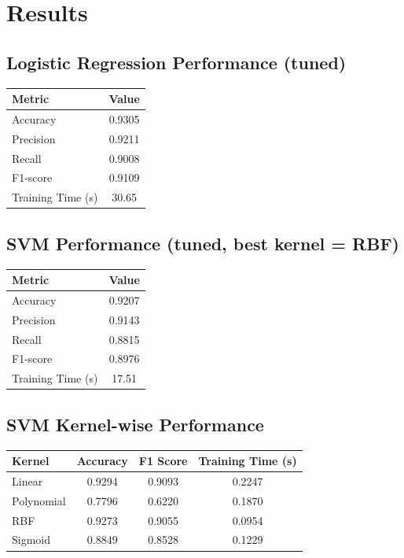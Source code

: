 \documentclass[12pt,a4paper]{article}
\begin{document}
\section{Results}

\subsection*{Logistic Regression Performance (tuned)}
\begin{tabular}{lc}
\toprule
Metric & Value\\
\midrule
Accuracy & 0.9305 \\
Precision & 0.9211 \\
Recall & 0.9008 \\
F1-score & 0.9109 \\
Training Time (s) & 30.65 \\
\bottomrule
\end{tabular}

\subsection*{SVM Performance (tuned, best kernel = RBF)}
\begin{tabular}{lc}
\toprule
Metric & Value\\
\midrule
Accuracy & 0.9207 \\
Precision & 0.9143 \\
Recall & 0.8815 \\
F1-score & 0.8976 \\
Training Time (s) & 17.51 \\
\bottomrule
\end{tabular}

\subsection*{SVM Kernel-wise Performance}
\begin{tabular}{lccc}
\toprule
Kernel & Accuracy & F1 Score & Training Time (s) \\
\midrule
Linear & 0.9294 & 0.9093 & 0.2247 \\
Polynomial & 0.7796 & 0.6220 & 0.1870 \\
RBF & 0.9273 & 0.9055 & 0.0954 \\
Sigmoid & 0.8849 & 0.8528 & 0.1229 \\
\bottomrule
\end{tabular}
\end{document}
